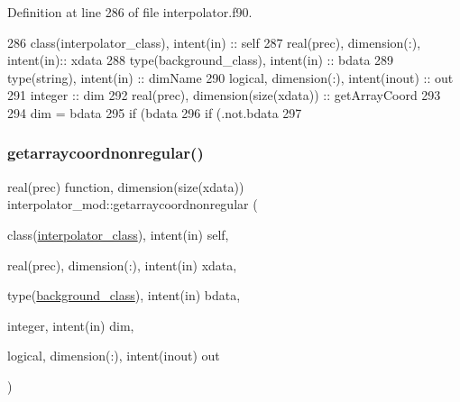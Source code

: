 Definition at line 286 of file interpolator.\+f90.


\begin{DoxyCode}
286     \textcolor{keywordtype}{class}(interpolator\_class), \textcolor{keywordtype}{intent(in)} :: self
287     \textcolor{keywordtype}{real(prec)}, \textcolor{keywordtype}{dimension(:)}, \textcolor{keywordtype}{intent(in)}:: xdata
288     \textcolor{keywordtype}{type}(background\_class), \textcolor{keywordtype}{intent(in)} :: bdata
289     \textcolor{keywordtype}{type}(string), \textcolor{keywordtype}{intent(in)} :: dimName
290     \textcolor{keywordtype}{logical}, \textcolor{keywordtype}{dimension(:)}, \textcolor{keywordtype}{intent(inout)} :: out
291     \textcolor{keywordtype}{integer} :: dim
292     \textcolor{keywordtype}{real(prec)}, \textcolor{keywordtype}{dimension(size(xdata))} :: getArrayCoord
293 
294     dim = bdata%
295     \textcolor{keywordflow}{if} (bdata%
296     \textcolor{keywordflow}{if} (.not.bdata%
297 
\end{DoxyCode}
\mbox{\label{namespaceinterpolator__mod_a559aea65a39f0e640874f388af7a259d}} 
\subsubsection{\texorpdfstring{getarraycoordnonregular()}{getarraycoordnonregular()}}
{\footnotesize\ttfamily real(prec) function, dimension(size(xdata)) interpolator\+\_\+mod\+::getarraycoordnonregular (\begin{DoxyParamCaption}\item[{class(\mbox{\hyperlink{structinterpolator__mod_1_1interpolator__class}{interpolator\+\_\+class}}), intent(in)}]{self,  }\item[{real(prec), dimension(\+:), intent(in)}]{xdata,  }\item[{type(\mbox{\hyperlink{structbackground__mod_1_1background__class}{background\+\_\+class}}), intent(in)}]{bdata,  }\item[{integer, intent(in)}]{dim,  }\item[{logical, dimension(\+:), intent(inout)}]{out }\end{DoxyParamCaption})\hspace{0.3cm}{\ttfamily [private]}}




